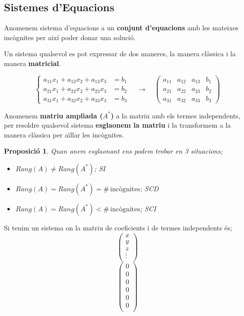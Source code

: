 \documentclass[12pt]{article}
\newtheorem{proposicio}{Proposició}[section]
\begin{document}
\subsection{Sistemes d'Equacions}

Anomenem sistema d'equacions a un \textbf{conjunt d'equacions} amb les mateixes incògnites per així poder donar una solució.

Un sistema qualsevol es pot expressar de dos maneres, la manera clàssica i la manera \textbf{matricial}.

\[
\left\{
\begin{aligned}
a_{11}x_1+a_{12}x_2+a_{13}x_3 &= b_1\\
a_{21}x_1+a_{22}x_2+a_{23}x_3 &= b_2\\
a_{31}x_1+a_{32}x_2+a_{33}x_3 &= b_3
\end{aligned}
\right.
\quad\longrightarrow\quad
\left(
\begin{array}{ccc|c}
a_{11} & a_{12} & a_{13} & b_1\\
a_{21} & a_{22} & a_{23} & b_2\\
a_{31} & a_{32} & a_{33} & b_3
\end{array}
\right)
\]

Anomenem \textbf{matriu ampliada ($A^*$)} a la matriu amb els termes independents, per resoldre qualsevol sistema \textbf{esglaonem la matriu} i la transformem a la manera clàssica per aïllar les incògnites.

\begin{proposicio}
    Quan anem esglaonant ens podem trobar en 3 situacions;
    \begin{itemize}
        \item $Rang(A)\neq Rang(A^*)$; SI
        \item $Rang(A) = Rang(A^*) = \#\,\text{incògnites}$; SCD
        \item $Rang(A) = Rang(A^*) < \#\,\text{incògnites}$; SCI
    \end{itemize}
\end{proposicio}

Si tenim un sistema on la matriu de coeficients i de termes independents és;
\[
\left(
\begin{array}{ccc|c}
    x\\
    y\\
    z\\
    \vdots\\
    
\end{array}
\right)
\]\[
\left(
\begin{array}{ccc|c}
    0\\
    0\\
    0\\
    0\\
    0\\
    0\\
\end{array}
\right)
\]
\end{document}
